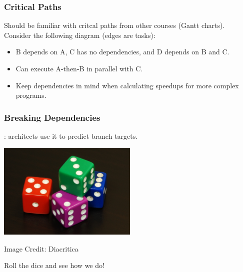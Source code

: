 \begin{frame}
  \frametitle{Critical Paths}

  

  Should be familiar with critcal paths from other courses (Gantt charts).\\[1em]

  Consider the following diagram (edges are tasks):

\begin{center}
\end{center}

  \begin{itemize}
    \item B depends on A, C has no dependencies, and D depends on B and C.
    \item Can execute A-then-B in parallel with C.
    \item Keep dependencies in mind when calculating speedups for more
      complex programs.
  \end{itemize}
  
\end{frame}


\begin{frame}
  \frametitle{Breaking Dependencies}

  
  : architects use it to predict
      branch targets.
  
  \begin{center}
  	\includegraphics[width=0.5\textwidth]{images/6sided_dice.jpg}
  \end{center}
  	\hfill Image Credit: Diacritica

Roll the dice and see how we do!

\end{frame}
  

